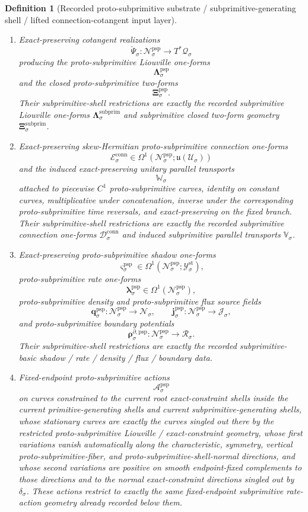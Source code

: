 \documentclass[11pt]{article}
\newcommand{\LieU}{\mathfrak u}
\newcommand{\StatTagClass}[1]{\mathcal Y_{#1}^{\mathrm{st}}}
\newcommand{\DensityClass}[1]{\mathscr N_{#1}}
\newcommand{\FluxClass}[1]{\mathscr J_{#1}}
\newcommand{\PhaseReadClass}[1]{\mathscr R_{#1}}
\newcommand{\RootClass}[1]{\mathscr U_{#1}}
\newcommand{\ConfigSpace}[1]{\mathcal Q_{#1}}
\newcommand{\ConstraintGap}[1]{\delta_{#1}}
\newcommand{\SubprimLiouville}[1]{\boldsymbol{\Lambda}_{#1}^{\mathrm{subprim}}}
\newcommand{\SubprimTwo}[1]{\boldsymbol{\Xi}_{#1}^{\mathrm{subprim}}}
\newcommand{\SubprimConnectionForm}[1]{\mathcal D_{#1}^{\mathrm{conn}}}
\newcommand{\SubprimTransport}[1]{\mathbb V_{#1}}
\newcommand{\ProtoSubprimSpace}[1]{\mathcal N_{#1}^{\mathrm{psp}}}
\newcommand{\ProtoSubprimCotangentRealization}[1]{\check{\Psi}_{#1}}
\newcommand{\ProtoSubprimLiouville}[1]{\boldsymbol{\Lambda}_{#1}^{\mathrm{psp}}}
\newcommand{\ProtoSubprimTwo}[1]{\boldsymbol{\Xi}_{#1}^{\mathrm{psp}}}
\newcommand{\ProtoSubprimConnectionForm}[1]{\mathcal E_{#1}^{\mathrm{conn}}}
\newcommand{\ProtoSubprimTransport}[1]{\mathbb W_{#1}}
\newcommand{\ProtoSubprimShadowForm}[1]{\boldsymbol{\varsigma}_{#1}^{\mathrm{psp}}}
\newcommand{\ProtoSubprimRateForm}[1]{\boldsymbol{\lambda}_{#1}^{\mathrm{psp}}}
\newcommand{\ProtoSubprimDensitySource}[1]{\boldsymbol{q}_{#1}^{\mathrm{psp}}}
\newcommand{\ProtoSubprimFluxSource}[1]{\boldsymbol{j}_{#1}^{\mathrm{psp}}}
\newcommand{\ProtoSubprimBoundarySource}[1]{\boldsymbol{\rho}_{#1}^{\partial,\mathrm{psp}}}
\newcommand{\ProtoSubprimAction}[1]{\mathscr A_{#1}^{\mathrm{psp}}}
\newtheorem{definition}{Definition}
\begin{document}
\begin{definition}[Recorded proto-subprimitive substrate / subprimitive-generating shell / lifted connection-cotangent input layer]
\begin{enumerate}
    \item Exact-preserving cotangent realizations
    \[
    \ProtoSubprimCotangentRealization{\sigma}:\ProtoSubprimSpace{\sigma}\to T^*\ConfigSpace{\sigma}
    \]
    producing the proto-subprimitive Liouville one-forms
    \[
    \ProtoSubprimLiouville{\sigma}
    \]
    and the closed proto-subprimitive two-forms
    \[
    \ProtoSubprimTwo{\sigma}.
    \]
    Their subprimitive-shell restrictions are exactly the recorded subprimitive Liouville one-forms \(\SubprimLiouville{\sigma}\) and subprimitive closed two-form geometry \(\SubprimTwo{\sigma}\).
    \item Exact-preserving skew-Hermitian proto-subprimitive connection one-forms
    \[
    \ProtoSubprimConnectionForm{\sigma}\in \Omega^1(\ProtoSubprimSpace{\sigma};\LieU(\RootClass{\sigma}))
    \]
    and the induced exact-preserving unitary parallel transports
    \[
    \ProtoSubprimTransport{\sigma}
    \]
    attached to piecewise \(C^1\) proto-subprimitive curves, identity on constant curves, multiplicative under concatenation, inverse under the corresponding proto-subprimitive time reversals, and exact-preserving on the fixed branch. Their subprimitive-shell restrictions are exactly the recorded subprimitive connection one-forms \(\SubprimConnectionForm{\sigma}\) and induced subprimitive parallel transports \(\SubprimTransport{\sigma}\).
    \item Exact-preserving proto-subprimitive shadow one-forms
    \[
    \ProtoSubprimShadowForm{\sigma}\in\Omega^1(\ProtoSubprimSpace{\sigma};\StatTagClass{\sigma}),
    \]
    proto-subprimitive rate one-forms
    \[
    \ProtoSubprimRateForm{\sigma}\in\Omega^1(\ProtoSubprimSpace{\sigma}),
    \]
    proto-subprimitive density and proto-subprimitive flux source fields
    \[
    \ProtoSubprimDensitySource{\sigma}:\ProtoSubprimSpace{\sigma}\to\DensityClass{\sigma},
    \qquad
    \ProtoSubprimFluxSource{\sigma}:\ProtoSubprimSpace{\sigma}\to\FluxClass{\sigma},
    \]
    and proto-subprimitive boundary potentials
    \[
    \ProtoSubprimBoundarySource{\sigma}:\ProtoSubprimSpace{\sigma}\to\PhaseReadClass{\sigma}.
    \]
    Their subprimitive-shell restrictions are exactly the recorded subprimitive-basic shadow / rate / density / flux / boundary data.
    \item Fixed-endpoint proto-subprimitive actions
    \[
    \ProtoSubprimAction{\sigma}
    \]
    on curves constrained to the current root exact-constraint shells inside the current primitive-generating shells and current subprimitive-generating shells, whose stationary curves are exactly the curves singled out there by the restricted proto-subprimitive Liouville / exact-constraint geometry, whose first variations vanish automatically along the characteristic, symmetry, vertical proto-subprimitive-fiber, and proto-subprimitive-shell-normal directions, and whose second variations are positive on smooth endpoint-fixed complements to those directions and to the normal exact-constraint directions singled out by \(\ConstraintGap{\sigma}\). These actions restrict to exactly the same fixed-endpoint subprimitive rate-action geometry already recorded below them.

\end{enumerate}
\end{definition}
\end{document}
